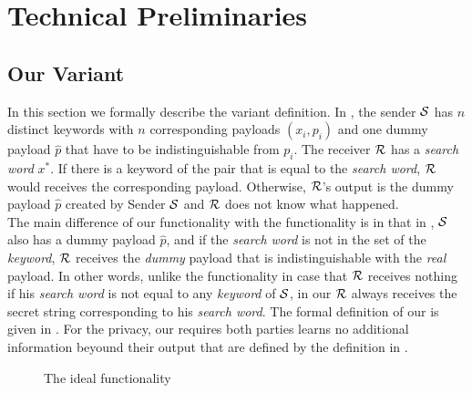 \section{Technical Preliminaries}
\label{sect:prelims}

\subsection{Our \SSOT Variant}
\label{sec:ssotfunc}

In this section we formally describe the variant \SSOT definition. In \SSOT, the sender $\mathcal{S}$  has $n$ distinct keywords with $n$ corresponding payloads $(x_i, p_i)$ and one dummy payload $\hat{p}$ that have to be indistinguishable from $p_i$. The receiver $\mathcal{R}$ has a \textit{search word} $x^*$. If there is a keyword of the pair that is equal to the \textit{search word}, $\mathcal{R}$  would receives the corresponding payload. Otherwise, $\mathcal{R}$'s output is the dummy payload $\hat{p}$ created by Sender $\mathcal{S}$ and $\mathcal{R}$ does not know what happened.\\ 
The main difference of our \SSOT functionality with the \KS\cite{TCC:FIPR05} functionality is in that in \SSOT, $\mathcal{S}$ also has a dummy payload $\hat{p}$, and if the \textit{search word} is not in the set of the \textit{keyword}, $\mathcal{R}$ receives the \textit{dummy} payload that is indistinguishable with the \textit{real} payload. In other words, unlike the \KS functionality\cite{TCC:FIPR05} in case that $\mathcal{R}$ receives nothing if his \textit{search word} is not equal to any \textit{keyword} of $\mathcal{S}$, in our \SSOT  $\mathcal{R}$ always receives the secret string corresponding to his \textit{search word}.  The formal definition of our \SSOT is given in  . For the privacy, our \SSOT requires both parties learns no additional information beyound their output that are defined by the definition in . 

\begin{figure}[htb]\centering
{}
\caption{The \SSOT ideal functionality}
\label{fig:1ssotfunc}
\end{figure} 

